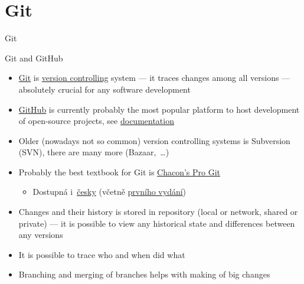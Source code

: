 \documentclass[compress, ucs, xelatex, 11pt, xcolor=svgnames,
  hyperref={
    bookmarks=true,
    unicode=true,
    colorlinks=true,
    pdftitle={Linux, command line and MetaCentrum},
    plainpages=false,
    pdfauthor={Vojtech Zeisek},
    pdfsubject={Course about use of Linux command line, writing shell scripts and using MetaCentrum of CESNET},
    pdfcreator={XeLaTeX},
    pdfkeywords={Linux, GNU, BASH, shell, command line, MetaCentrum},
    linkcolor=DarkRed,
    anchorcolor=DarkBlue,
    citecolor=Indigo,
    filecolor=NavyBlue,
    menucolor=DarkMagenta,
    urlcolor=DarkBlue,
    pdftex},
  url={hyphens, lowtilde} %
  ]{beamer}
\begin{document}

\section{Git} %

\begin{frame}{Git}
  \tableofcontents[currentsection, sectionstyle=show/hide, hideothersubsections]
\end{frame}

\begin{frame}[fragile]{Git and GitHub}
  \begin{itemize}
    \item \href{https://git-scm.com/}{Git} is \href{https://en.wikipedia.org/wiki/Version_control}{version controlling} system --- it traces changes among all versions --- absolutely crucial for any software development
    \item \href{https://github.com/}{GitHub} is currently probably the most popular platform to host development of open-source projects, see \href{https://help.github.com/}{documentation}
    \item Older (nowadays not so common) version controlling systems is Subversion (SVN), there are many more (Bazaar,~\ldots)
    \item Probably the best textbook for Git is \href{https://git-scm.com/book/en/v2}{Chacon's Pro Git}
    \begin{itemize}
      \item Dostupná i~\href{https://git-scm.com/book/cs/v2}{česky} (včetně \href{https://knihy.nic.cz/}{prvního vydání})
    \end{itemize}
    \item Changes and their history is stored in repository (local or network, shared or private) --- it is possible to view any historical state and differences between any versions
    \item It is possible to trace who and when did what
    \item Branching and merging of branches helps with making of big changes
  \end{itemize}
\end{frame}
\end{document}
